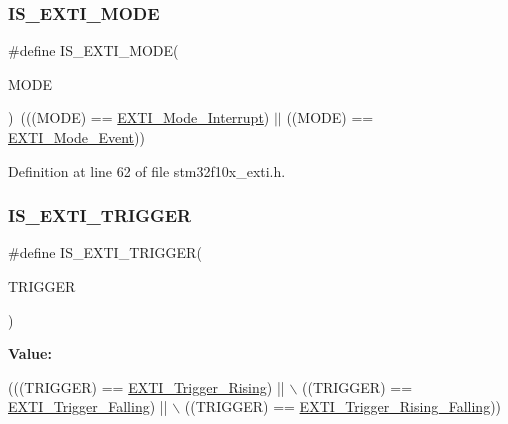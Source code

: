 \subsubsection{\texorpdfstring{I\+S\+\_\+\+E\+X\+T\+I\+\_\+\+M\+O\+DE}{IS\_EXTI\_MODE}}
{\footnotesize\ttfamily \#define I\+S\+\_\+\+E\+X\+T\+I\+\_\+\+M\+O\+DE(\begin{DoxyParamCaption}\item[{}]{M\+O\+DE }\end{DoxyParamCaption})~(((M\+O\+DE) == \hyperlink{group___e_x_t_i___exported___types_ggad5e69af98dc0dfdf64417adc1cf57929a8c6ccdd7b1bc4872731306537e8c3b42}{E\+X\+T\+I\+\_\+\+Mode\+\_\+\+Interrupt}) $\vert$$\vert$ ((M\+O\+DE) == \hyperlink{group___e_x_t_i___exported___types_ggad5e69af98dc0dfdf64417adc1cf57929aa38ef186929ec74786df79877ea124a7}{E\+X\+T\+I\+\_\+\+Mode\+\_\+\+Event}))}



Definition at line 62 of file stm32f10x\+\_\+exti.\+h.

\mbox{\label{group___e_x_t_i___exported___types_gaee95ec6288944a6245696896604e509e}} 
\subsubsection{\texorpdfstring{I\+S\+\_\+\+E\+X\+T\+I\+\_\+\+T\+R\+I\+G\+G\+ER}{IS\_EXTI\_TRIGGER}}
{\footnotesize\ttfamily \#define I\+S\+\_\+\+E\+X\+T\+I\+\_\+\+T\+R\+I\+G\+G\+ER(\begin{DoxyParamCaption}\item[{}]{T\+R\+I\+G\+G\+ER }\end{DoxyParamCaption})}

{\bfseries Value\+:}
\begin{DoxyCode}
(((TRIGGER) == \hyperlink{group___e_x_t_i___exported___types_gga9da190f5425d1b421a06bced8cc48e9baaa73605adf491dbe97994612e228af5e}{EXTI\_Trigger\_Rising}) || \(\backslash\)
                                  ((TRIGGER) == \hyperlink{group___e_x_t_i___exported___types_gga9da190f5425d1b421a06bced8cc48e9bac4a21d397aa4648b8f8cf961f71f3ac5}{EXTI\_Trigger\_Falling}) || \(\backslash\)
                                  ((TRIGGER) == \hyperlink{group___e_x_t_i___exported___types_gga9da190f5425d1b421a06bced8cc48e9bab09db55a2e9118e86d03d69698434ebb}{EXTI\_Trigger\_Rising\_Falling}))
\end{DoxyCode}


